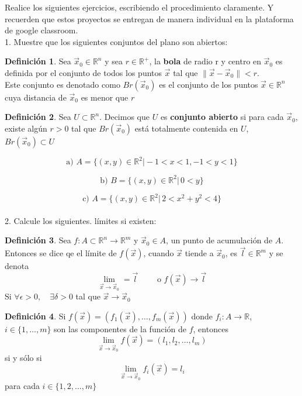 \documentclass[letterpaper]{article}
\providecommand{\norm}[1]{\lVert#1\rVert}
\newcommand{\R}{\mathds{R}}
\renewcommand{\*}{\cdot}
\theoremstyle{definition}
\newtheorem{definition}{Definición}
\begin{document}
\noindent Realice los siguientes ejercicios, escribiendo el procedimiento claramente. Y recuerden que estos proyectos se entregan de manera individual en la plataforma de google classroom. \\[0.5cm]
1.  Muestre que los siguientes conjuntos del plano son abiertos: 
\begin{definition}
	Sea $ \vec{x}_0  \in \R^n$  y sea $ r \in \R^+ $, la \textbf{bola} de radio r y centro en $ \vec{x}_0 $ es definida por el conjunto de todos los puntos $ \vec{x} $ tal que $ \norm{\vec{x} - \vec{x}_0} < r $.\\ Este conjunto es denotado como $ Br(\vec{x}_0) $ es el conjunto de los puntos $ \vec{x} \in \R^n $ cuya distancia de $ \vec{x}_0 $ es menor que $ r $
\end{definition}

\begin{definition}
	Sea $ U \subset \R^n $. Decimos que $ U $ es \textbf{conjunto abierto} si para cada $ \vec{x}_0 $, existe algún $ r>0 $ tal que $ Br(\vec{x}_0) $ está totalmente contenida en $ U $, $ Br(\vec{x}_0) \subset U $

\end{definition}

$$\text{a) } A = \{ (x,y) \in \mathbb{R}^2 \vert - 1 < x < 1, - 1 < y < 1 \}$$

$$\text{b) }B = \{ (x,y) \in \mathbb{R}^2 \vert \,  0 < y  \}$$

$$\text{c) }A = \{ (x,y) \in \mathbb{R}^2 \vert \, 2 < x^2  + y^2 <  4 \}$$\\[0.5cm]
2.  Calcule los siguientes. límites si existen: 
\begin{definition}
	Sea $ f: A \subset \R^n \to \R^m $ y $ \vec{x}_0 \in A $, un punto de acumulación de $ A $. Entonces se dice qe el límite de $  f(\vec{x}) $, cuando $ \vec{x} $ tiende a $ \vec{x}_0 $, es $ \vec{\textit{l}} \in \R^m $ y se denota
	\[ \lim\limits_{\vec{x} \to \vec{x}_0} = \vec{\textit{l}} \qquad \text{ o } f(\vec{x}) \to \vec{\textit{l}} \]
	Si $ \forall \epsilon > 0, \quad \exists  \delta > 0 $ tal que $ \vec{x} \to \vec{x}_0 $
\end{definition}
\begin{definition}
	Si $ f(\vec{x}) = (f_1(\vec{x}), \dots, f_m(\vec{x})) $ donde $ f_i:A \to \R  $, $ i \in \{ 1, \dots, m \} $  son las componentes de la función de $ f $, entonces 
	\[ \lim\limits_{\vec{x} \to \vec{x}_0 } f(\vec{x}) = (l_1, l_2, \dots, l_m) \] si y sólo si\[ \lim\limits_{\vec{x} \to \vec{x}_0} f_i(\vec{x}) = l_i \] para cada $ i \in \{ 1, 2, \dots, m \} $
\end{definition}
\end{document}
